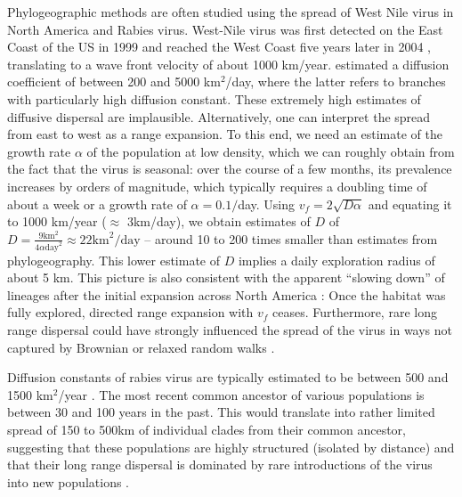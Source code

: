 \documentclass[aps,rmp, twocolumn]{revtex4}
\newcommand{\vfkpp}{v_f}
\begin{document}
Phylogeographic methods are often studied using the spread of West Nile virus in North America and Rabies virus.
West-Nile virus was first detected on the East Coast of the US in 1999 and reached the West Coast five years later in 2004 \citep{pybus_unifying_2012}, translating to a wave front velocity of about 1000 km/year.
\citet{pybus_unifying_2012} estimated a diffusion coefficient of between 200 and 5000 km$^2$/day, where the latter refers to branches with particularly high diffusion constant.
These extremely high estimates of diffusive dispersal are implausible.
Alternatively, one can interpret the spread from east to west as a range expansion.
To this end, we need an estimate of the growth rate $\alpha$ of the population at low density, which we can roughly obtain from the fact that the virus is seasonal: over the course of a few months, its prevalence increases by orders of magnitude, which typically requires a doubling time of about a week or a growth rate of $\alpha=0.1/$day.
Using $\vfkpp = 2\sqrt{D\alpha}$ and equating it to 1000 km/year ($\approx$ 3km/day), we obtain estimates of $D$ of $D=\frac{9 \mathrm{km}^2}{4 \alpha \mathrm{day}^2} \approx 22\mathrm{km}^2/\mathrm{day}$ -- around 10 to 200 times smaller than estimates from phylogeography.
This lower estimate of $D$ implies a daily exploration radius of about 5 km.
This picture is also consistent with the apparent ``slowing down'' of lineages after the initial expansion across North America \citep{dellicour_epidemiological_2020}: Once the habitat was fully explored, directed range expansion with $\vfkpp$ ceases.
Furthermore, rare long range dispersal could have strongly influenced the spread of the virus in ways not captured by Brownian or relaxed random walks \citep{hallatschek_acceleration_2014}.

Diffusion constants of rabies virus are typically estimated to be between 500 and 1500 km$^2$/year \citep{dellicour_using_2017}.
The most recent common ancestor of various populations is between 30 and 100 years in the past.
This would translate into rather limited spread of 150 to 500km of individual clades from their common ancestor, suggesting that these populations are highly structured (isolated by distance) and that their long range dispersal is dominated by rare introductions of the virus into new populations \citep{brunker_elucidating_2015}.
\end{document}
